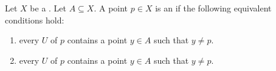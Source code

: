 \begin{definition} \label{definition:accumulation_point_of_a_subset_of_a_topological_space}
    Let $X$ be a . Let $A \subseteq X$.
    A point $p \in X$ is an  if the following equivalent conditions hold:
    \begin{enumerate}
        \item every  $U$ of $p$ contains a point $y \in A$ such that $y \neq p$.
        \item every  $U$ of $p$ contains a point $y \in A$ such that $y \neq p$.
    \end{enumerate}
\end{definition}